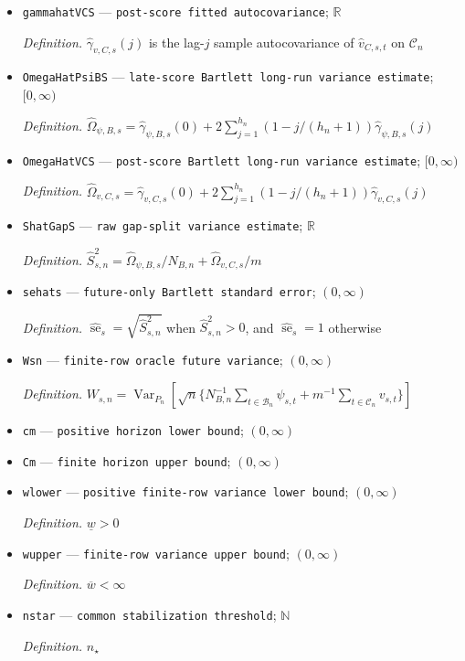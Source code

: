 \documentclass{article}
\begin{document}
\begin{itemize}
  \item \texttt{gammahatVCS} --- \texttt{post-\allowbreak{}score fitted autocovariance}; \(\mathbb R\)
  \par\smallskip\noindent\emph{Definition.} \(\widehat\gamma_{v,C,s}(j)\) is the lag-\(j\) sample autocovariance of \(\widehat v_{C,s,t}\) on \(\mathcal C_n\)
  \item \texttt{OmegaHatPsiBS} --- \texttt{late-\allowbreak{}score Bartlett long-\allowbreak{}run variance estimate}; \([0,\infty)\)
  \par\smallskip\noindent\emph{Definition.} \(\widehat\Omega_{\psi,B,s}=\widehat\gamma_{\psi,B,s}(0)+2\sum_{j=1}^{h_n}(1-j/(h_n+1))\widehat\gamma_{\psi,B,s}(j)\)
  \item \texttt{OmegaHatVCS} --- \texttt{post-\allowbreak{}score Bartlett long-\allowbreak{}run variance estimate}; \([0,\infty)\)
  \par\smallskip\noindent\emph{Definition.} \(\widehat\Omega_{v,C,s}=\widehat\gamma_{v,C,s}(0)+2\sum_{j=1}^{h_n}(1-j/(h_n+1))\widehat\gamma_{v,C,s}(j)\)
  \item \texttt{ShatGapS} --- \texttt{raw gap-\allowbreak{}split variance estimate}; \(\mathbb R\)
  \par\smallskip\noindent\emph{Definition.} \(\widehat S_{s,n}^2=\widehat\Omega_{\psi,B,s}/N_{B,n}+\widehat\Omega_{v,C,s}/m\)
  \item \texttt{sehats} --- \texttt{future-\allowbreak{}only Bartlett standard error}; \((0,\infty)\)
  \par\smallskip\noindent\emph{Definition.} \(\widehat{\operatorname{se}}_s=\sqrt{\widehat S_{s,n}^2}\) when \(\widehat S_{s,n}^2>0\), and \(\widehat{\operatorname{se}}_s=1\) otherwise
  \item \texttt{Wsn} --- \texttt{finite-\allowbreak{}row oracle future variance}; \((0,\infty)\)
  \par\smallskip\noindent\emph{Definition.} \(W_{s,n}=\operatorname{Var}_{P_n}[\sqrt n\{N_{B,n}^{-1}\sum_{t\in\mathcal B_n}\psi_{s,t}+m^{-1}\sum_{t\in\mathcal C_n}v_{s,t}\}]\)
  \item \texttt{cm} --- \texttt{positive horizon lower bound}; \((0,\infty)\)
  \item \texttt{Cm} --- \texttt{finite horizon upper bound}; \((0,\infty)\)
  \item \texttt{wlower} --- \texttt{positive finite-\allowbreak{}row variance lower bound}; \((0,\infty)\)
  \par\smallskip\noindent\emph{Definition.} \(\underline w>0\)
  \item \texttt{wupper} --- \texttt{finite-\allowbreak{}row variance upper bound}; \((0,\infty)\)
  \par\smallskip\noindent\emph{Definition.} \(\overline w<\infty\)
  \item \texttt{nstar} --- \texttt{common stabilization threshold}; \(\mathbb N\)
  \par\smallskip\noindent\emph{Definition.} \(n_\star\)
\end{itemize}
\end{document}
